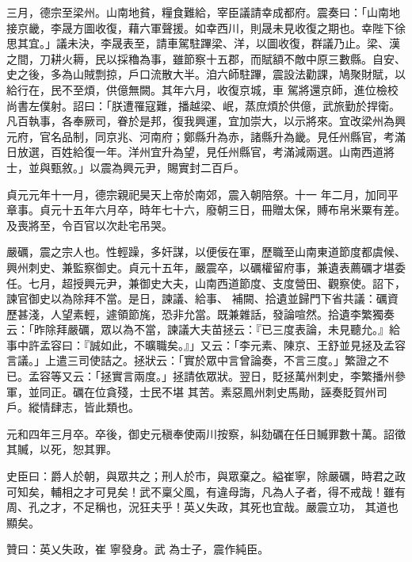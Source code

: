 \begin{pinyinscope}
 三月，德宗至梁州。山南地貧，糧食難給，宰臣議請幸成都府。震奏曰：「山南地接京畿，李晟方圖收復，藉六軍聲援。如幸西川，則晟未見收復之期也。幸陛下徐思其宜。」議未決，李晟表至，請車駕駐蹕梁、洋，以圖收復，群議乃止。梁、漢之間，刀耕火耨，民以採穭為事，雖節察十五郡，而賦額不敵中原三數縣。自安、史之後，多為山賊剽掠，戶口流散大半。洎六師駐蹕，震設法勸課，鳩聚財賦，以給行在，民不至煩，供億無闕。其年六月，收復京城，車
 駕將還京師，進位檢校尚書左僕射。詔曰：「朕遭罹寇難，播越梁、岷，蒸庶煩於供億，武旅勤於捍衛。凡百執事，各奉厥司，眷於是邦，復我興運，宜加崇大，以示將來。宜改梁州為興元府，官名品制，同京兆、河南府；鄭縣升為赤，諸縣升為畿。見任州縣官，考滿日放選，百姓給復一年。洋州宜升為望，見任州縣官，考滿減兩選。山南西道將士，並與甄敘。」以震為興元尹，賜實封二百戶。



 貞元元年十一月，德宗親祀昊天上帝於南郊，震入朝陪祭。十一
 年二月，加同平章事。貞元十五年六月卒，時年七十六，廢朝三日，冊贈太保，賻布帛米粟有差。及喪將至，令百官以次赴宅吊哭。



 嚴礪，震之宗人也。性輕躁，多奸謀，以便佞在軍，歷職至山南東道節度都虞候、興州刺史、兼監察御史。貞元十五年，嚴震卒，以礪權留府事，兼遺表薦礪才堪委任。七月，超授興元尹，兼御史大夫，山南西道節度、支度營田、觀察使。詔下，諫官御史以為除拜不當。是日，諫議、給事、
 補闕、拾遺並歸門下省共議：礪資歷甚淺，人望素輕，遽領節旄，恐非允當。既兼雜話，發論喧然。拾遺李繁獨奏云：「昨除拜嚴礪，眾以為不當，諫議大夫苗拯云：『已三度表論，未見聽允。』給事中許孟容曰：『誠如此，不曠職矣。』」又云：「李元素、陳京、王舒並見拯及孟容言議。」上遣三司使詰之。拯狀云：「實於眾中言曾論奏，不言三度。」繁證之不已。孟容等又云：「拯實言兩度。」拯請依眾狀。翌日，貶拯萬州刺史，李繁播州參軍，並同正。礪在位貪殘，士民不堪
 其苦。素惡鳳州刺史馬勛，誣奏貶賀州司戶。縱情肆志，皆此類也。



 元和四年三月卒。卒後，御史元稹奉使兩川按察，糾劾礪在任日贓罪數十萬。詔徵其贓，以死，恕其罪。



 史臣曰：爵人於朝，與眾共之；刑人於市，與眾棄之。縊崔寧，除嚴礪，時君之政可知矣，輔相之才可見矣！武不稟父風，有違母誨，凡為人子者，得不戒哉！雖有周、孔之才，不足稱也，況狂夫乎！英乂失政，其死也宜哉。嚴震立功，
 其道也顯矣。



 贊曰：英乂失政，崔
 寧發身。武
 為士子，震作純臣。



\end{pinyinscope}